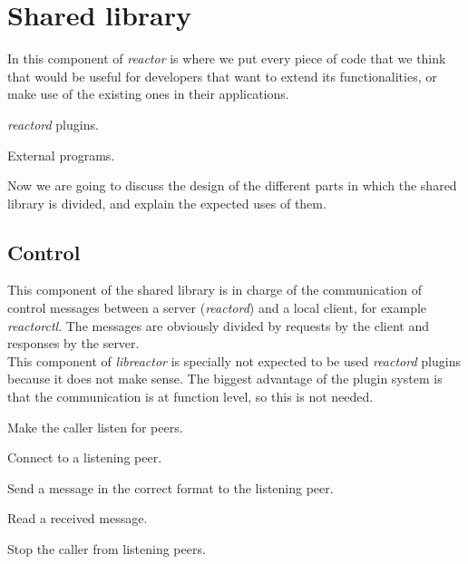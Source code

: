 \section{Shared library}
\label{sec:lib}
In this component of \emph{reactor} is where we put every piece of code that we think that would be useful for developers that want to
extend its functionalities, or make use of the existing ones in their applications.
\begin{list}{-}{So we could divide its main use cases in two:}
  \item \emph{reactord} plugins.
  \item External programs.
\end{list}
Now we are going to discuss the design of the different parts in which the shared library is divided, and explain the expected uses of them.
\subsection{Control}
\label{sec:cntrl}
This component of the shared library is in charge of the communication of control messages between a server (\emph{reactord}) and a local
client, for example \emph{reactorctl}. The messages are obviously divided by requests by the client and responses by the server.\\
This component of \emph{libreactor} is specially not expected to be used \emph{reactord} plugins because it does not make sense. The
biggest advantage of the plugin system is that the communication is at function level, so this is not needed.
\begin{list}{-}{It mainly has to:}
  \item Make the caller listen for peers.
  \item Connect to a listening peer.
  \item Send a message in the correct format to the listening peer.
  \item Read a received message.
  \item Stop the caller from listening peers.
\end{list}
